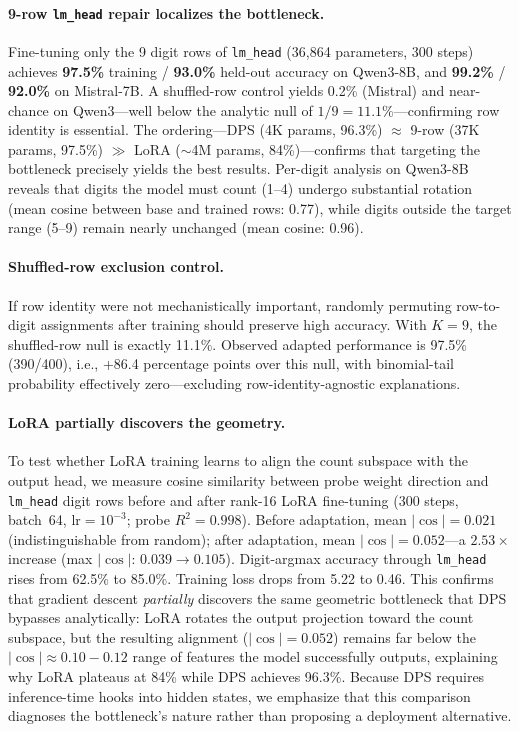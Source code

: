 \documentclass{article}
\begin{document}
\paragraph{9-row \texttt{lm\_head} repair localizes the bottleneck.}
Fine-tuning only the 9 digit rows of \texttt{lm\_head} (36{,}864 parameters, 300 steps) achieves \textbf{97.5\%} training / \textbf{93.0\%} held-out accuracy on Qwen3-8B, and \textbf{99.2\%} / \textbf{92.0\%} on Mistral-7B.
A shuffled-row control yields 0.2\% (Mistral) and near-chance on Qwen3---well below the analytic null of $1/9 = 11.1\%$---confirming row identity is essential.
The ordering---DPS (4K params, 96.3\%) $\approx$ 9-row (37K params, 97.5\%) $\gg$ LoRA (${\sim}$4M params, 84\%)---confirms that targeting the bottleneck precisely yields the best results.
Per-digit analysis on Qwen3-8B reveals that digits the model must count (1--4) undergo substantial
rotation (mean cosine between base and trained rows: 0.77), while digits outside the
target range (5--9) remain nearly unchanged (mean cosine: 0.96).

\paragraph{Shuffled-row exclusion control.}
If row identity were not mechanistically important, randomly permuting row-to-digit assignments
after training should preserve high accuracy. With $K=9$, the shuffled-row null is exactly 11.1\%.
Observed adapted performance is 97.5\% (390/400), i.e., +86.4 percentage points over this null,
with binomial-tail probability effectively zero---excluding row-identity-agnostic explanations.

\paragraph{LoRA partially discovers the geometry.}
To test whether LoRA training learns to align the count subspace with the output head,
we measure cosine similarity between probe weight direction and \texttt{lm\_head}
digit rows before and after rank-16 LoRA fine-tuning (300 steps, batch~64, lr$=10^{-3}$;
probe $R^2 = 0.998$).
Before adaptation, mean $|\cos| = 0.021$ (indistinguishable from random);
after adaptation, mean $|\cos| = 0.052$---a $2.53\times$ increase
(max $|\cos|$: $0.039 \to 0.105$).
Digit-argmax accuracy through \texttt{lm\_head} rises from 62.5\% to 85.0\%.
Training loss drops from 5.22 to 0.46.
This confirms that gradient descent \emph{partially} discovers the same geometric
bottleneck that DPS bypasses analytically: LoRA rotates the output projection
toward the count subspace, but the resulting alignment ($|\cos| = 0.052$) remains
far below the $|\cos| \approx 0.10{-}0.12$ range of features the model successfully
outputs, explaining why LoRA plateaus at 84\% while DPS achieves 96.3\%.
Because DPS requires inference-time hooks into hidden states, we emphasize that
this comparison diagnoses the bottleneck's nature rather than proposing a
deployment alternative.
\end{document}
